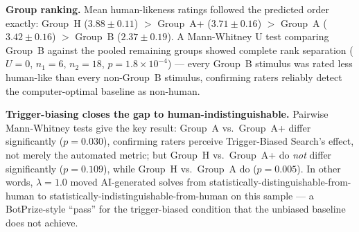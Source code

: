 \documentclass[10pt,conference]{article}
\begin{document}
\textbf{Group ranking.} Mean human-likeness ratings followed the
predicted order exactly: Group~H ($3.88 \pm 0.11$) $>$ Group~A+
($3.71 \pm 0.16$) $>$ Group~A ($3.42 \pm 0.16$) $>$ Group~B
($2.37 \pm 0.19$). A Mann-Whitney U test comparing Group~B against
the pooled remaining groups showed complete rank separation
($U=0$, $n_1=6$, $n_2=18$, $p=1.8\times10^{-4}$) --- every Group~B
stimulus was rated less human-like than every non-Group~B stimulus,
confirming raters reliably detect the computer-optimal baseline as
non-human.

\textbf{Trigger-biasing closes the gap to human-indistinguishable.}
Pairwise Mann-Whitney tests give the key result: Group~A vs.\
Group~A+ differ significantly ($p=0.030$), confirming raters
perceive Trigger-Biased Search's effect, not merely the automated
metric; but Group~H vs.\ Group~A+ do \emph{not} differ significantly
($p=0.109$), while Group~H vs.\ Group~A do ($p=0.005$). In other
words, $\lambda=1.0$ moved AI-generated solves from
statistically-distinguishable-from-human to
statistically-indistinguishable-from-human on this sample --- a
BotPrize-style ``pass'' for the trigger-biased condition that the
unbiased baseline does not achieve.
\end{document}
